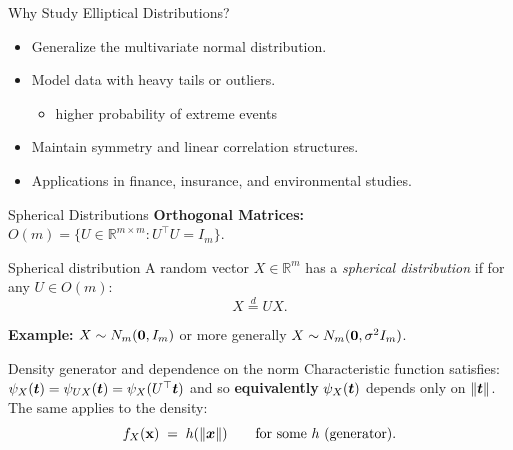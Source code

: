 \documentclass[11pt,handout,aspectratio=169]{beamer}
\begin{document}
\begin{frame}{Why Study Elliptical Distributions?}
    \begin{itemize}
        \item Generalize the multivariate normal distribution.\\[5mm]
        \item Model data with heavy tails or outliers.
        \begin{itemize}
        \item higher probability of extreme events\\[5mm]
        \end{itemize}
        \item Maintain symmetry and linear correlation structures.\\[5mm]
        \item Applications in finance, insurance, and environmental studies.
    \end{itemize}
\end{frame}

\begin{frame}{Spherical Distributions}
\textbf{Orthogonal Matrices:} $O(m) = \{ U \in \mathbb{R}^{m \times m} : U^\top U = I_m \}$.
\begin{alertblock}{Spherical distribution}
A random vector $X \in \mathbb{R}^m$ has a \emph{spherical distribution} if for any $U \in O(m)$:
  \begin{equation*}
    X \overset{d}{=} U X.
  \end{equation*}	
\end{alertblock}
\textbf{\alert{Example:}} $X\sim N_m(\boldsymbol 0,I_m)$ or more generally $X\sim N_m(\boldsymbol 0,\sigma^2 I_m)$.
\begin{block}{Density generator and dependence on the norm}
	Characteristic function satisfies: $\psi_X(\boldsymbol t)=\psi_{UX}(\boldsymbol t)=\psi_X(U^\top \boldsymbol t)$ and so \textbf{equivalently} $\psi_X(\boldsymbol t)$ depends only on $\|\boldsymbol t\|$. The same applies to the density: $$f_X(\mathbf{x})\;=\;h(\|\boldsymbol x\|)\qquad\mbox{for some }h\mbox{ (generator)}.$$
\end{block}
  \end{frame}
\end{document}
